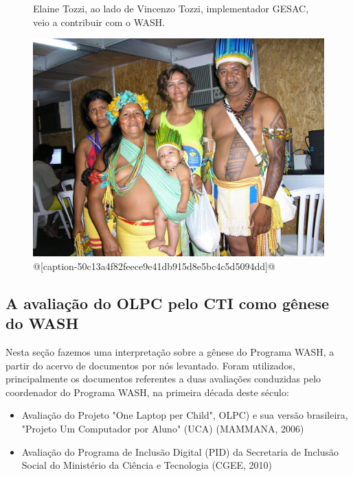 \begin{figure}[htb]
\begin{minipage}[b]{0.4\linewidth}
                \caption{Elaine Tozzi, ao lado de Vincenzo Tozzi, implementador GESAC, veio a contribuir com o WASH.}
                \label{4459669909728990ef00df4bdb6a369f3449704e}
\end{minipage}
\hspace{0.5cm}
\begin{minipage}[b]{0.4\linewidth}
        \centering
                \includegraphics[width=1.0\linewidth]{../../../imagens/povo.JPG}
                \caption{@[caption-50c13a4f82feece9e41db915d8e5bc4c5d5094dd]@}
                \label{50c13a4f82feece9e41db915d8e5bc4c5d5094dd}
\end{minipage}%
\hspace{0.5cm}
\end{figure}



\subsection[A avaliação do OLPC pelo CTI como gênese do WASH]{A avaliação do OLPC pelo CTI como gênese do WASH}\label{A avaliação do OLPC pelo CTI como gênese do WASH}
Nesta seção fazemos uma interpretação sobre a gênese do Programa WASH, a partir do acervo de documentos por nós levantado. Foram utilizados, principalmente  os documentos referentes a duas avaliações conduzidas pelo coordenador do Programa WASH, na primeira década deste século:


\begin{itemize}
\item Avaliação do Projeto "One Laptop per Child", OLPC) e sua versão brasileira, "Projeto Um Computador por Aluno" (UCA) (MAMMANA, 2006)
\item Avaliação do Programa de Inclusão Digital (PID) da Secretaria de Inclusão Social do Ministério da Ciência e Tecnologia (CGEE, 2010)
\end{itemize}

